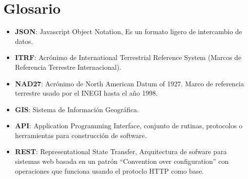 \chapter {Glosario}
    \begin{itemize}
		\item \textbf{JSON}: Javascript Object Notation, Es un formato ligero de intercambio de datos.
		\item \textbf{ITRF}: Acrónimo de International Terrestrial Reference System (Marcos de Referencia Terrestre Internacional).
		\item \textbf{NAD27}: Acrónimo de North American Datum of 1927. Marco de referencia terrestre usado por el INEGI hasta el año 1998.
		\item \textbf{GIS}: Sistema de Información Geográfica.
    \item \textbf{API}: Application Programming Interface, conjunto de rutinas, protocolos o herramientas para construcción de software.
    \item \textbf{REST}: Representational State Transfer, Arquitectura de sofware para sistemas web basada en un patrón ``Convention over configuration'' con operaciones que funciona usando el protoclo HTTP como base.
	\end{itemize}